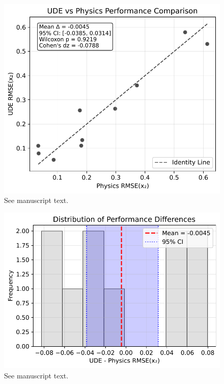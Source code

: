\begin{figure}[t]
\centering
\includegraphics[width=0.9\linewidth]{paper/figures/fig1_scatter_rmse_x2_ude_vs_physics_improved.pdf}
\caption{See manuscript text.}
\end{figure}

\begin{figure}[t]
\centering
\includegraphics[width=0.9\linewidth]{paper/figures/fig2_hist_delta_rmse_x2_ude_minus_physics_improved.pdf}
\caption{See manuscript text.}
\end{figure}

